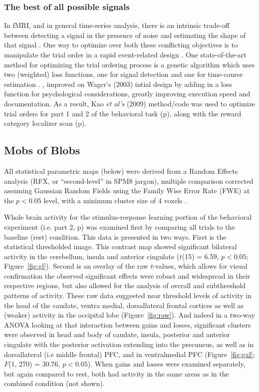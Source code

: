 \documentclass[doc,12pt]{apa}        %
\begin{document}
\subsubsection{The best of all possible signals}
\label{subsub:bestsignal}
In fMRI, and in general time-series analysis, there is an intrinsic trade-off between detecting a signal in the presence of noise and estimating the shape of that signal \cite{Dale:1999p7901,Birn:2002p1777,Liu:2004p2141}.   One way to optimize over both these conflicting objectives is to manipulate the trial order in a rapid event-related design \cite{Miezin:2000p7924}.  One state-of-the-art method for optimizing the trial ordering process is a genetic algorithm which uses two (weighted) loss functions, one for signal detection and one for time-course estimation \cite{Wager:2003p2980}. , improved on Wager's (2003) intial design by adding in a loss function for psychological considerations, greatly improving execution speed and documentation.  As a result, Kao \emph{et al's} (2009) method/code was used to optimize trial orders for part 1 and 2 of the behavioral task (p\pageref{subsub:whatwhen}), along with the reward category localizer scan (p\pageref{subsub:datadetails}).

\subsection{Mobs of Blobs}
\label{sub:blob}
All statistical parametric maps (below) were derived from a Random Effects analysis (RFX, or ``second-level'' in SPM8 jargon), multiple comparison corrected assuming Gaussian Random Fields using the Family Wise Error Rate (FWE) at the $p < 0.05$ level, with a minimum cluster size of 4 voxels \cite{Worsley:1996p9367}. 

Whole brain activity for the stimulus-response learning portion of the behavioral experiment (i.e. part 2, p\pageref{subsub:whatwhen}) was examined first by comparing all trials to the baseline (rest) condition.  This data is presented in two ways. First is the statistical thresholded image.  This contrast map showed significant bilateral activity in the cerebellum, insula and anterior cingulate ($t$(15) = 6.59, $p< 0.05$; Figure~\ref{fig:gl}).  Second is an overlay of the raw $t$-values, which allows for visual confirmation the observed significant effects were robust and widespread in their respective regions, but also allowed for the analysis of overall and subthreshold patterns of activity.  These raw data suggested near threshold levels of activity in the head of the caudate, ventra medial, dorsallateral frontal cortices as well as (weaker) activity in the occipital lobe (Figure~\ref{fig:raw}).  And indeed in a two-way ANOVA looking at that interaction between gains and losses, significant clusters were observed in head and body of caudate, insula, posterior and anterior cingulate with the posterior activation extending into the precuneus, as well as in dorsallateral (i.e middle frontal) PFC, and in ventralmedial PFC (Figure~\ref{fig:gxl}; $F$(1, 270) = 30.76, $p < 0.05$).  When gains and losses were examined separately, but again compared to rest, both had activity in the same areas as in the combined condition (not shown).
\end{document}
